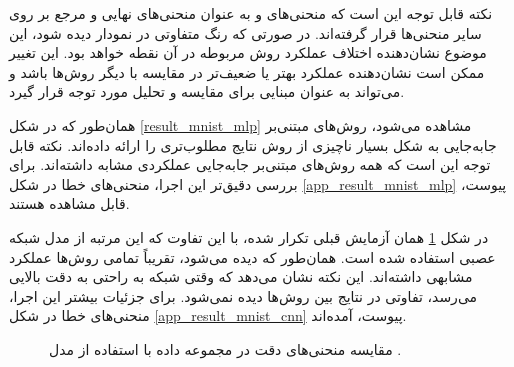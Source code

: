 نکته قابل توجه این است که منحنی‌های
و
به عنوان منحنی‌های نهایی و مرجع بر روی سایر منحنی‌ها قرار گرفته‌اند. در صورتی که رنگ متفاوتی در نمودار دیده شود، این موضوع نشان‌دهنده اختلاف عملکرد روش مربوطه در آن نقطه خواهد بود. این تغییر ممکن است نشان‌دهنده عملکرد بهتر یا ضعیف‌تر در مقایسه با دیگر روش‌ها باشد و می‌تواند به عنوان مبنایی برای مقایسه و تحلیل مورد توجه قرار گیرد.




همان‌طور که در شکل
\ref{result_mnist_mlp} 
مشاهده می‌شود، روش‌های مبتنی‌بر جابه‌جایی به شکل بسیار ناچیزی از روش
نتایج مطلوب‌تری را ارائه داده‌اند. نکته قابل توجه این است که همه روش‌های مبتنی‌بر جابه‌جایی عملکردی مشابه داشته‌اند. برای بررسی دقیق‌تر این اجرا، منحنی‌های خطا در شکل
\ref{app_result_mnist_mlp}
پیوست، قابل مشاهده هستند.


در شکل
\ref{result_mnist_cnn}
همان آزمایش قبلی تکرار شده، با این تفاوت که این مرتبه از مدل شبکه عصبی
استفاده شده است. همان‌طور که دیده می‌شود، تقریباً تمامی روش‌ها عملکرد مشابهی داشته‌اند. این نکته نشان می‌دهد که وقتی شبکه به راحتی به دقت بالایی می‌رسد، تفاوتی در نتایج بین روش‌ها دیده نمی‌شود. برای جزئیات بیشتر این اجرا، منحنی‌های خطا در شکل
\ref{app_result_mnist_cnn}
پیوست، آمده‌اند.


\begin{figure}[t]
	\centering
	\hspace{0.8mm}
	\caption{
		مقایسه منحنی‌های دقت در مجموعه داده
		با استفاده از مدل
		.
	}
	\label{result_mnist_cnn}
\end{figure}





